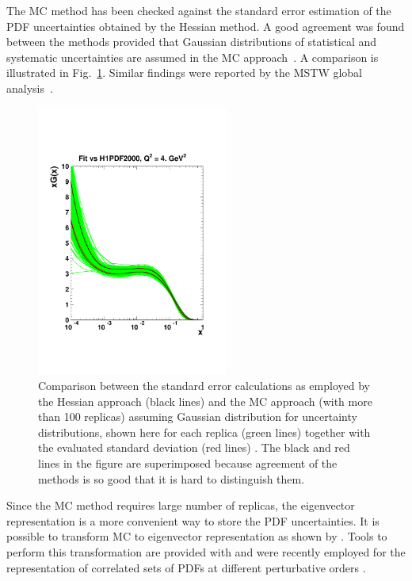 \begin{description}
The MC method has been checked against the standard error estimation of the PDF uncertainties obtained by the Hessian method. 
A good agreement was found between the methods provided that Gaussian distributions of statistical and systematic uncertainties are assumed in the MC 
approach~\cite{hera-lhc:report2009}.
A comparison is illustrated in Fig.~\ref{fig:mchessian}. 
Similar findings were reported by the MSTW global analysis~\cite{Watt:2012tq}. 
\begin{figure}[!ht]
 \centering
  \includegraphics[trim=1cm 4cm 1cm 5cm, clip, width=6.3cm]{mchessian.pdf}
  \caption{Comparison between the standard error calculations as employed by the Hessian approach (black lines) 
           and the MC approach (with more than 100 replicas) assuming Gaussian distribution for uncertainty 
           distributions, shown here for each replica 
          (green lines) together with the evaluated standard deviation (red lines) \cite{hera-lhc:report2009}.
          The black and red lines in the figure are superimposed because agreement of the methods is so good that it is hard to distinguish them.}
  \label{fig:mchessian}        
\end{figure}
%

Since the MC method requires large number of replicas, the eigenvector representation 
is a more convenient way to store the PDF uncertainties.
It is possible to transform MC to eigenvector
representation as shown by \cite{Gao:2013bia}. Tools to perform this transformation are provided with \fitter and were 
recently employed for the representation of correlated sets of PDFs at different perturbative orders \cite{hfcorrpaper}.
%
\end{description}
